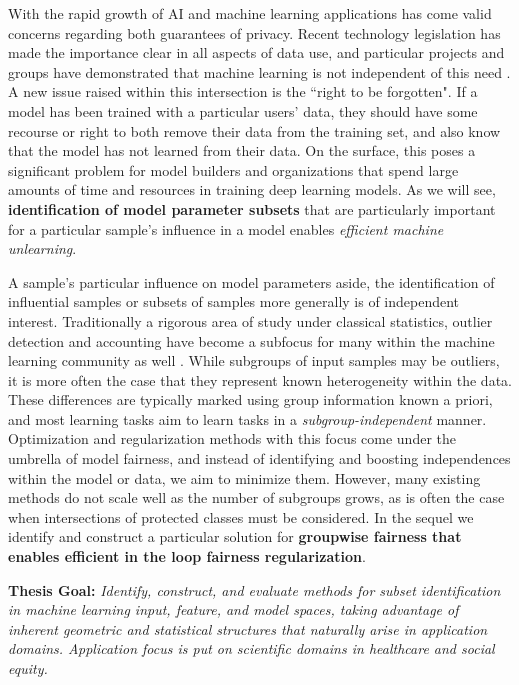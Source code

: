 With the rapid growth of AI and machine learning applications has come valid concerns regarding both guarantees of privacy.
Recent technology legislation has made the importance clear in all aspects of data use,
and particular projects and groups have demonstrated that machine learning is not independent of
this need \citep{Exposing}.
A new issue raised within this intersection is the ``right to be forgotten".
If a model has been trained with a particular users' data, 
they should have some recourse or right
to both remove their data from the training set,
and also know that the model has not learned from their data.
On the surface, this poses a significant problem for model builders
and organizations that spend large amounts
of time and resources in 
training deep learning models.
As we will see, 
\textbf{identification of model parameter subsets}
that are particularly important
for a particular sample's influence
in a model enables \textit{efficient machine unlearning}.



A sample's particular influence on model parameters aside, the identification of influential samples or subsets of samples more generally is of independent interest. 
Traditionally a rigorous area of study under classical statistics, outlier detection and accounting have become a subfocus for many within the machine learning community as well \citep{golatkar2020eternal,golatkar2020forgetting,huang2020feature,ren2019likelihood}.
While subgroups of input samples may be outliers, it is more often the case that they represent known heterogeneity within the data. 
These differences are typically marked using 
group information known a priori, and 
most learning tasks aim to learn tasks
in a \textit{subgroup-independent} manner.
Optimization and regularization methods with this focus come under the umbrella of model fairness, and instead of identifying and boosting independences within the model or data, we aim to minimize them.
However, many existing methods do not scale well as the number of subgroups grows, as is often the case when intersections of protected classes must be considered. In the sequel we identify and construct a particular solution for \textbf{groupwise fairness that enables efficient in the loop fairness regularization}.

\begin{mdframed}[style=MyFrame]
\textbf{ Thesis Goal: }
\em Identify, construct, and evaluate methods for subset identification in machine learning input, feature, and model spaces, taking advantage of inherent geometric and statistical structures that naturally arise in application domains. 
Application focus is put on scientific domains in healthcare and social equity.
\end{mdframed}


